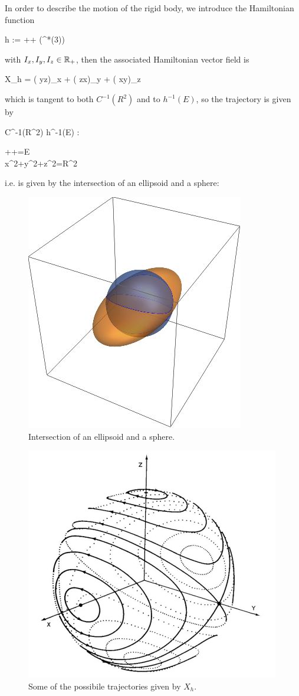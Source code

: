 \documentclass[main.tex]{subfiles}
\begin{document}
\begin{example}
	In order to describe the motion of the rigid body, we introduce the Hamiltonian function
	\begin{eqalign}
		h := ++ \in \Cinfty(^*(3))
	\end{eqalign}
	with $I_x, I_y, I_z \in \mathbb{R}_+$, then the associated Hamiltonian vector field is 
	\begin{eqalign}
		X_h = \left ( yz\right)\partial_x + \left ( zx\right)\partial_y + \left ( xy\right)\partial_z
	\end{eqalign}
	which is tangent to both $C^{-1}(R^2)$ and to $h^{-1}(E)$, so the trajectory is given by
	\begin{eqalign}
		C^{-1}(R^2) \cap h^{-1}(E) : \begin{cases}
			++\frac{z^2}{2I_z}=E\\
			x^2+y^2+z^2=R^2
		\end{cases}
	\end{eqalign}
	i.e. is given by the intersection of an ellipsoid and a sphere:
	\begin{figure}[H]
		\centering
		\includegraphics[width=.35\textwidth]{figures/sphere-ellipsoid-inters.jpg}
		\caption{Intersection of an ellipsoid and a sphere.}
		\label{fig:sphere-ellipsoid-inters}
	\end{figure}
	\begin{figure}[H]
		\centering
		\includegraphics[width=.35\textwidth]{figures/rigid_body_phase_space.jpg}
		\caption{Some of the possibile trajectories given by $X_h$.}

\end{figure}
\end{example}
\end{document}
